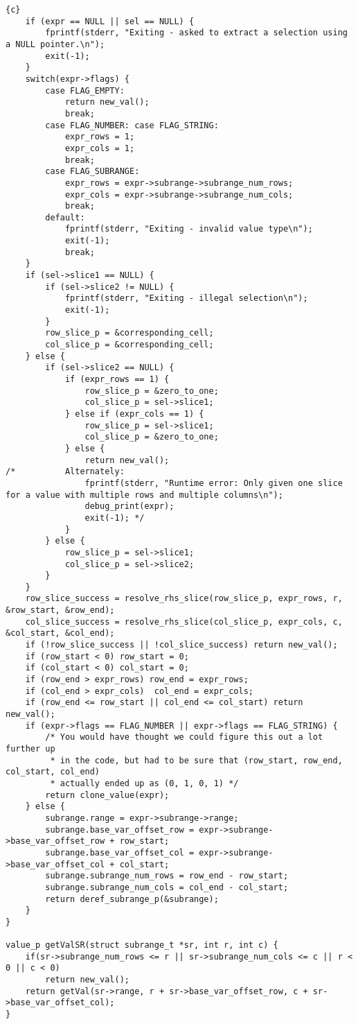 \begin{lstlisting}{c}
	if (expr == NULL || sel == NULL) {
		fprintf(stderr, "Exiting - asked to extract a selection using a NULL pointer.\n");
		exit(-1);
	}
	switch(expr->flags) {
		case FLAG_EMPTY:
			return new_val();
			break;
		case FLAG_NUMBER: case FLAG_STRING:
			expr_rows = 1;
			expr_cols = 1;
			break;
		case FLAG_SUBRANGE:
			expr_rows = expr->subrange->subrange_num_rows;
			expr_cols = expr->subrange->subrange_num_cols;
			break;
		default:
			fprintf(stderr, "Exiting - invalid value type\n");
			exit(-1);
			break;
	}
	if (sel->slice1 == NULL) {
		if (sel->slice2 != NULL) {
			fprintf(stderr, "Exiting - illegal selection\n");
			exit(-1);
		}
		row_slice_p = &corresponding_cell;
		col_slice_p = &corresponding_cell;
	} else {
		if (sel->slice2 == NULL) {
			if (expr_rows == 1) {
				row_slice_p = &zero_to_one;
				col_slice_p = sel->slice1;
			} else if (expr_cols == 1) {
				row_slice_p = sel->slice1;
				col_slice_p = &zero_to_one;
			} else {
				return new_val();
/*			Alternately:
				fprintf(stderr, "Runtime error: Only given one slice for a value with multiple rows and multiple columns\n");
				debug_print(expr);
				exit(-1); */
			}
		} else {
			row_slice_p = sel->slice1;
			col_slice_p = sel->slice2;
		}
	}
	row_slice_success = resolve_rhs_slice(row_slice_p, expr_rows, r, &row_start, &row_end);
	col_slice_success = resolve_rhs_slice(col_slice_p, expr_cols, c, &col_start, &col_end);
	if (!row_slice_success || !col_slice_success) return new_val();
	if (row_start < 0) row_start = 0;
	if (col_start < 0) col_start = 0;
	if (row_end > expr_rows) row_end = expr_rows;
	if (col_end > expr_cols)  col_end = expr_cols;
	if (row_end <= row_start || col_end <= col_start) return new_val();
	if (expr->flags == FLAG_NUMBER || expr->flags == FLAG_STRING) {
		/* You would have thought we could figure this out a lot further up
		 * in the code, but had to be sure that (row_start, row_end, col_start, col_end)
		 * actually ended up as (0, 1, 0, 1) */
		return clone_value(expr);
	} else {
		subrange.range = expr->subrange->range;
		subrange.base_var_offset_row = expr->subrange->base_var_offset_row + row_start;
		subrange.base_var_offset_col = expr->subrange->base_var_offset_col + col_start;
		subrange.subrange_num_rows = row_end - row_start;
		subrange.subrange_num_cols = col_end - col_start;
		return deref_subrange_p(&subrange);
	}
}

value_p getValSR(struct subrange_t *sr, int r, int c) {
	if(sr->subrange_num_rows <= r || sr->subrange_num_cols <= c || r < 0 || c < 0)
		return new_val();
	return getVal(sr->range, r + sr->base_var_offset_row, c + sr->base_var_offset_col);
}


\end{lstlisting}
